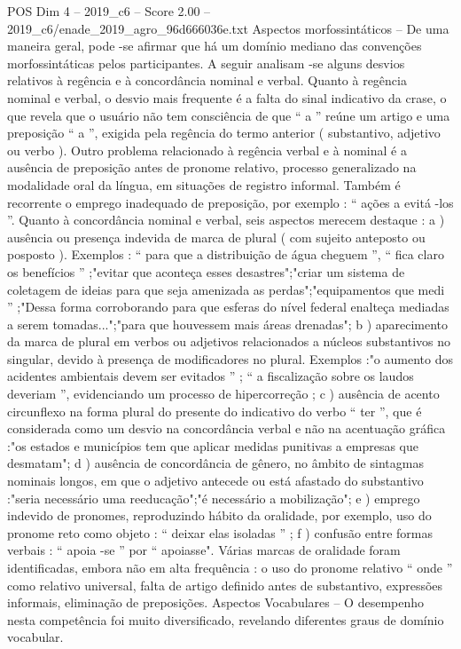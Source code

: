 \begin{textsample}{POS Dim 4 – 2019\_c6 – Score 2.00 – 2019\_c6/enade\_2019\_agro\_96d666036e.txt}
Aspectos morfossintáticos – De uma maneira geral, pode -se afirmar que há um domínio mediano das convenções morfossintáticas pelos participantes.
A seguir analisam -se alguns desvios relativos à regência e à concordância nominal e verbal.
Quanto à regência nominal e verbal, o desvio mais frequente é a falta do sinal indicativo da crase, o que revela que o usuário não tem consciência de que “ a ” reúne um artigo e uma preposição “ a ”, exigida pela regência do termo anterior ( substantivo, adjetivo ou verbo ).
Outro problema relacionado à regência verbal e à nominal é a ausência de preposição antes de pronome relativo, processo generalizado na modalidade oral da língua, em situações de registro informal.
Também é recorrente o emprego inadequado de preposição, por exemplo : “ ações a evitá -los ”.
Quanto à concordância nominal e verbal, seis aspectos merecem destaque : a ) ausência ou presença indevida de marca de plural ( com sujeito anteposto ou posposto ).
Exemplos : “ para que a distribuição de água cheguem ”, “ fica claro os benefícios ” ;"evitar que aconteça esses desastres";"criar um sistema de coletagem de ideias para que seja amenizada as perdas";"equipamentos que medi ” ;"Dessa forma corroborando para que esferas do nível federal enalteça mediadas a serem tomadas...";"para que houvessem mais áreas drenadas"; b ) aparecimento da marca de plural em verbos ou adjetivos relacionados a núcleos substantivos no singular, devido à presença de modificadores no plural.
Exemplos :"o aumento dos acidentes ambientais devem ser evitados ” ; “ a fiscalização sobre os laudos deveriam ”, evidenciando um processo de hipercorreção ; c ) ausência de acento circunflexo na forma plural do presente do indicativo do verbo “ ter ”, que é considerada como um desvio na concordância verbal e não na acentuação gráfica :"os estados e municípios tem que aplicar medidas punitivas a empresas que desmatam"; d ) ausência de concordância de gênero, no âmbito de sintagmas nominais longos, em que o adjetivo antecede ou está afastado do substantivo :"seria necessário uma reeducação";"é necessário a mobilização"; e ) emprego indevido de pronomes, reproduzindo hábito da oralidade, por exemplo, uso do pronome reto como objeto : “ deixar elas isoladas ” ; f ) confusão entre formas verbais : “ apoia -se ” por “ apoiasse".
Várias marcas de oralidade foram identificadas, embora não em alta frequência : o uso do pronome relativo “ onde ” como relativo universal, falta de artigo definido antes de substantivo, expressões informais, eliminação de preposições.
Aspectos Vocabulares – O desempenho nesta competência foi muito diversificado, revelando diferentes graus de domínio vocabular.

\end{textsample}
